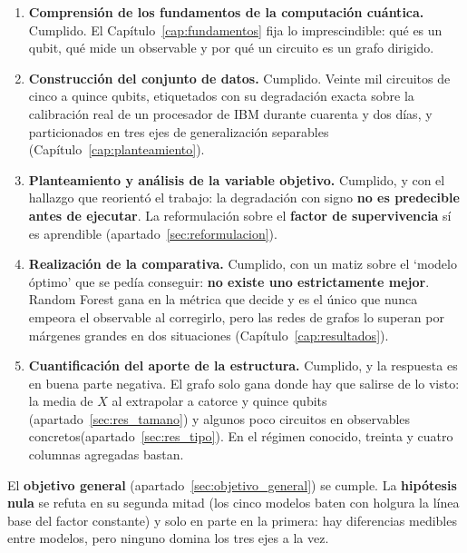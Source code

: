 \begin{enumerate}
    \item \textbf{Comprensión de los fundamentos de la computación cuántica.} Cumplido. El
          Capítulo~\ref{cap:fundamentos} fija lo imprescindible: qué es un qubit, qué mide un
          observable y por qué un circuito es un grafo dirigido.

    \item \textbf{Construcción del conjunto de datos.} Cumplido. Veinte mil circuitos de cinco
          a quince qubits, etiquetados con su degradación exacta sobre la calibración real de
          un procesador de IBM durante cuarenta y dos días, y particionados en tres ejes de
          generalización separables (Capítulo~\ref{cap:planteamiento}).

    \item \textbf{Planteamiento y análisis de la variable objetivo.} Cumplido, y con el
          hallazgo que reorientó el trabajo: la degradación con signo \textbf{no es predecible
          antes de ejecutar}. La reformulación sobre el
          \textbf{factor de supervivencia} sí es aprendible (apartado~\ref{sec:reformulacion}).

    \item \textbf{Realización de la comparativa.} Cumplido, con un matiz sobre el `modelo
          óptimo' que se pedía conseguir: \textbf{no existe uno estrictamente mejor}. Random
          Forest gana en la métrica que decide y es el único que nunca empeora el observable al
          corregirlo, pero las redes de grafos lo superan por márgenes grandes en dos
          situaciones (Capítulo~\ref{cap:resultados}).

    \item \textbf{Cuantificación del aporte de la estructura.} Cumplido, y la respuesta es en
          buena parte negativa. El grafo solo gana donde hay que salirse de lo visto: la media
          de $X$ al extrapolar a catorce y quince qubits (apartado~\ref{sec:res_tamano}) y algunos poco circuitos en observables concretos(apartado~\ref{sec:res_tipo}). En el régimen conocido,
          treinta y cuatro columnas agregadas bastan.
\end{enumerate}

El \textbf{objetivo general} (apartado~\ref{sec:objetivo_general}) se cumple. La
\textbf{hipótesis nula} se refuta en su segunda mitad (los cinco modelos baten con holgura la
línea base del factor constante) y solo en parte en la primera: hay diferencias medibles entre
modelos, pero ninguno domina los tres ejes a la vez.

